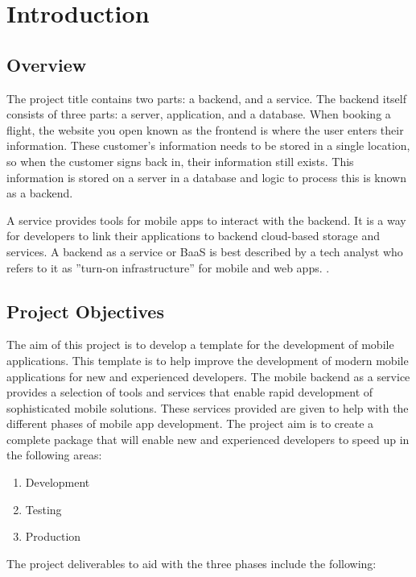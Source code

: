 \chapter{Introduction}

\section{Overview}

The project title contains two parts: a backend, and a service. The backend itself consists of three parts: a server, application, and a database. When booking a flight, the website you open known as the frontend is where the user enters their information. These customer’s information needs to be stored in a single location, so when the customer signs back in, their information still exists. This information is stored on a server in a database and logic to process this is known as a backend.

A service provides tools for mobile apps to interact with the backend. It is a way for developers to link their applications to backend cloud-based storage and services. A backend as a service or BaaS is best described by a tech analyst who refers to it as ''turn-on infrastructure'' for mobile and web apps. \cite{kinveywebsite}.

\section{Project Objectives}
The aim of this project is to develop a template for the development of mobile applications. This template is to help improve the development of modern mobile applications for new and experienced developers. The mobile backend as a service provides a selection of tools and services that enable rapid development of sophisticated mobile solutions. These services provided are given to help with the different phases of mobile app development. The project aim is to create a complete package that will enable new and experienced developers to speed up in the following areas:

\begin{enumerate}
  \item Development
  \item Testing 
  \item Production
\end{enumerate}

The project deliverables to aid with the three phases include the following:

